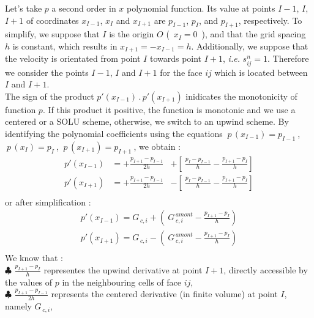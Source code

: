 Let's take  $p$ a second order in $x$ polynomial function. Its value at points $I-1$, $I$, $I+1$ of coordinates  $x_{I-1}$, $x_I$ and $x_{I+1}$ are $p_{I-1}$, $p_I$, and 
$p_{I+1}$, respectively. To simplify, we
suppose that $I$ is the origin $O$ (~$x_I = 0$~), and that the grid spacing $h$ is constant,
which results in $ x_{I+1} = - x_{I-1} = h $. Additionally, we suppose that the
velocity is orientated from point $I$ towards point $I+1$, {\it i.e.} $s^n_{ij} =
1$. Therefore we consider the points $I-1$, $I$ and $I+1$ for  the face
$ij$ which is located between $I$ and $I+1$.\\
The sign of the product $ p'(x_{I-1})\,.\,p'(x_{I+1}) $ inidicates the monotonicity
of function $p$. If this product it positive, the function is monotonic and 
we use a centered or a SOLU scheme, otherwise, we switch to an upwind scheme. By identifying
the polynomial coefficients using the equations $\  p\,(x_{I-1}) = p_{I-1}\
$, $\ p\,(x_I) = p_I\ $,  $\ p\,(x_{I+1}) = p_{I+1}\ $, we obtain :\\
\begin{equation}
\begin{array}{lll}
p'(x_{I-1})& = + \displaystyle \frac{p_{I+1} -  p_{I-1}}{2h} & +
\left[\displaystyle {\ \frac{p_I - p_{I-1}}{h} - \frac{p_{I+1} -  p_I}{h} }\right]\\
p'(x_{I+1})& = + \displaystyle \frac{p_{I+1} -  p_{I-1}}{2h} & -
\left[\displaystyle {\ \frac{p_I - p_{I-1}}{h} - \frac{p_{I+1} -  p_I}{h} }\right] \\
\end{array}
\end{equation}
or after simplification :
\begin{equation}
\begin{array}{lll}
p'(x_{I-1}) = G_{\,c,i} + \left(\ G^{\,amont}_{\,c,i} - \displaystyle \frac{p_{I+1} -  p_I}{h}\right)\\
p'(x_{I+1}) = G_{\,c,i} - \left(\ G^{\,amont}_{\,c,i} - \displaystyle \frac{p_{I+1} -  p_I}{h}\right)\\
\end{array}
\end{equation}
We know that :\\
{\tiny $\clubsuit$} $\displaystyle \frac{p_{I+1} -  p_I}{h}$ representes the
upwind derivative at point $I+1$, directly accessible by the
values of $p$ in the neighbouring cells of face $ij$,\\
{\tiny $\clubsuit$} $\displaystyle \frac{p_{I+1} -  p_{I-1}}{2h}$ represents the
centered derivative (in finite volume) at point $I$, namely $ G_{\,c,i}$,\\
